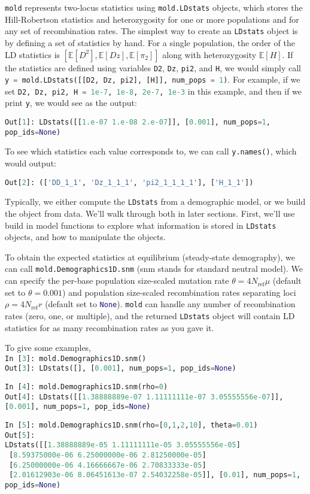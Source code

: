 \documentclass[10pt]{article}
\makeatletter
\newcommand{\mold}{\texttt{mold}\xspace}
\newcommand{\py}[1]{\lstinline[breaklines=true,language=Python, showstringspaces=False]@#1@}
\newcommand{\E}{\mathbb{E}}
\makeatother
\begin{document}
\mold represents two-locus statistics using \py{mold.LDstats} objects, which stores the Hill-Robertson statistics and heterozygosity for one or more populations and for any set of recombination rates.
The simplest way to create an \py{LDstats} object is by defining a set of statistics by hand.
For a single population, the order of the LD statistics is $[\E[D^2], \E[Dz], \E[\pi_2]]$ along with heterozygosity $\E[H]$.
If the statistics are defined using variables \py{D2}, \py{Dz}, \py{pi2}, and \py{H}, we would simply call \py{y = mold.LDstats([[D2, Dz, pi2], [H]], num_pops = 1)}.
For example, if we set \py{D2, Dz, pi2, H = 1e-7, 1e-8, 2e-7, 1e-3} in this example, and then if we print \py{y}, we would see as the output:

\py{Out[1]: LDstats([[1.e-07 1.e-08 2.e-07]], [0.001], num_pops=1, pop_ids=None)}

To see which statistics each value corresponds to, we can call \py{y.names()}, which would output:

\py{Out[2]: (['DD_1_1', 'Dz_1_1_1', 'pi2_1_1_1_1'], ['H_1_1'])}

Typically, we either compute the \py{LDstats} from a demographic model, or we build the object from data.
We'll walk through both in later sections.
First, we'll use build in model functions to explore what information is stored in \py{LDstats} objects, and how to manipulate the objects.

To obtain the expected statistics at equilibrium (steady-state demography), we can call \py{mold.Demographics1D.snm} (snm stands for standard neutral model).
We can specify the per-base population size-scaled mutation rate $\theta = 4N_\text{ref}\mu$ (default set to $\theta=0.001$) and population size-scaled recombination rates separating loci $\rho=4 N_\text{ref} r$ (default set to \py{None}).
\mold can handle any number of recombination rates (zero, one, or multiple), and the returned \py{LDstats} object will contain LD statistics for as many recombination rates as you gave it.

To give some examples,\\
\py{In [3]: mold.Demographics1D.snm()}\\
\py{Out[3]: LDstats([], [0.001], num_pops=1, pop_ids=None)}

\py{In [4]: mold.Demographics1D.snm(rho=0)}\\
\py{Out[4]: LDstats([[1.38888889e-07 1.11111111e-07 3.05555556e-07]], [0.001], num_pops=1, pop_ids=None)}

\py{In [5]: mold.Demographics1D.snm(rho=[0,1,2,10], theta=0.01)}\\
\py{Out[5]:}\\
\py{LDstats([[1.38888889e-05 1.11111111e-05 3.05555556e-05]}\\
\py{ [8.59375000e-06 6.25000000e-06 2.81250000e-05]}\\
\py{ [6.25000000e-06 4.16666667e-06 2.70833333e-05]}\\
\py{ [2.01612903e-06 8.06451613e-07 2.54032258e-05]], [0.01], num_pops=1, pop_ids=None)}
\end{document}
